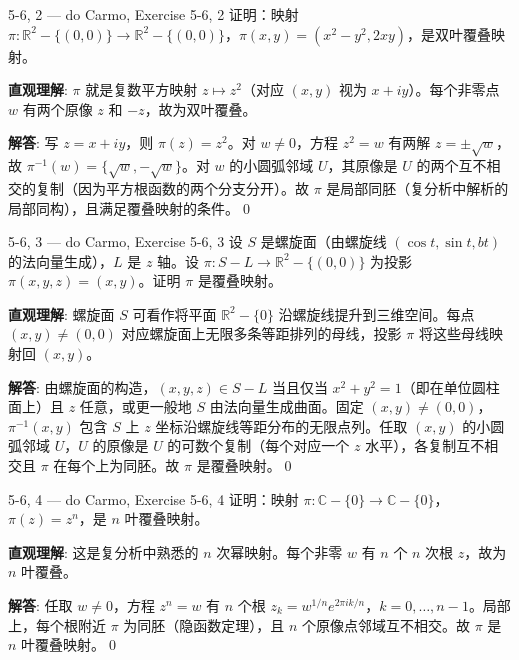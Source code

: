 \begin{exercise}{5-6, 2 — do Carmo, Exercise 5-6, 2}
证明：映射 $\pi: \mathbb{R}^2 - \{(0,0)\} \to \mathbb{R}^2 - \{(0,0)\}$，$\pi(x,y) = (x^2-y^2, 2xy)$，是双叶覆叠映射。
\end{exercise}
\begin{solution}
\textbf{直观理解}: $\pi$ 就是复数平方映射 $z\mapsto z^2$（对应 $(x,y)$ 视为 $x+iy$）。每个非零点 $w$ 有两个原像 $z$ 和 $-z$，故为双叶覆叠。

\textbf{解答}: 写 $z=x+iy$，则 $\pi(z)=z^2$。对 $w\neq 0$，方程 $z^2=w$ 有两解 $z=\pm\sqrt{w}$，故 $\pi^{-1}(w)=\{\sqrt{w},-\sqrt{w}\}$。对 $w$ 的小圆弧邻域 $U$，其原像是 $U$ 的两个互不相交的复制（因为平方根函数的两个分支分开）。故 $\pi$ 是局部同胚（复分析中解析的局部同构），且满足覆叠映射的条件。\qed
\end{solution}

\begin{exercise}{5-6, 3 — do Carmo, Exercise 5-6, 3}
设 $S$ 是螺旋面（由螺旋线 $(\cos t, \sin t, bt)$ 的法向量生成），$L$ 是 $z$ 轴。设 $\pi: S - L \to \mathbb{R}^2 - \{(0,0)\}$ 为投影 $\pi(x,y,z) = (x,y)$。证明 $\pi$ 是覆叠映射。
\end{exercise}
\begin{solution}
\textbf{直观理解}: 螺旋面 $S$ 可看作将平面 $\mathbb{R}^2-\{0\}$ 沿螺旋线提升到三维空间。每点 $(x,y)\neq(0,0)$ 对应螺旋面上无限多条等距排列的母线，投影 $\pi$ 将这些母线映射回 $(x,y)$。

\textbf{解答}: 由螺旋面的构造，$(x,y,z)\in S-L$ 当且仅当 $x^2+y^2=1$（即在单位圆柱面上）且 $z$ 任意，或更一般地 $S$ 由法向量生成曲面。固定 $(x,y)\neq(0,0)$，$\pi^{-1}(x,y)$ 包含 $S$ 上 $z$ 坐标沿螺旋线等距分布的无限点列。任取 $(x,y)$ 的小圆弧邻域 $U$，$U$ 的原像是 $U$ 的可数个复制（每个对应一个 $z$ 水平），各复制互不相交且 $\pi$ 在每个上为同胚。故 $\pi$ 是覆叠映射。\qed
\end{solution}

\begin{exercise}{5-6, 4 — do Carmo, Exercise 5-6, 4}
证明：映射 $\pi: \mathbb{C} - \{0\} \to \mathbb{C} - \{0\}$，$\pi(z) = z^n$，是 $n$ 叶覆叠映射。
\end{exercise}
\begin{solution}
\textbf{直观理解}: 这是复分析中熟悉的 $n$ 次幂映射。每个非零 $w$ 有 $n$ 个 $n$ 次根 $z$，故为 $n$ 叶覆叠。

\textbf{解答}: 任取 $w\neq 0$，方程 $z^n=w$ 有 $n$ 个根 $z_k=w^{1/n}e^{2\pi ik/n}$，$k=0,\dots,n-1$。局部上，每个根附近 $\pi$ 为同胚（隐函数定理），且 $n$ 个原像点邻域互不相交。故 $\pi$ 是 $n$ 叶覆叠映射。\qed
\end{solution}

